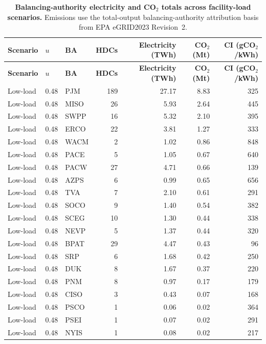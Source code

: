 \documentclass[12pt]{article}
\begin{document}
\begin{landscape}
\scriptsize
\begin{longtable}{ll l r r r r}
\caption{\textbf{Balancing-authority electricity and CO$_2$ totals across facility-load scenarios.} Emissions use the total-output balancing-authority attribution basis from EPA eGRID2023 Revision~2.}\label{tab:ba_scenarios_round3}\\
\toprule
\textbf{Scenario} & \textbf{$u$} & \textbf{BA} & \textbf{HDCs} & \textbf{Electricity (TWh)} & \textbf{CO$_2$ (Mt)} & \textbf{CI (gCO$_2$/kWh)} \\
\midrule
\endfirsthead
\toprule
\textbf{Scenario} & \textbf{$u$} & \textbf{BA} & \textbf{HDCs} & \textbf{Electricity (TWh)} & \textbf{CO$_2$ (Mt)} & \textbf{CI (gCO$_2$/kWh)} \\
\midrule
\endhead
Low-load & 0.48 & PJM & 189 & 27.17 & 8.83 & 325 \\
Low-load & 0.48 & MISO & 26 & 5.93 & 2.64 & 445 \\
Low-load & 0.48 & SWPP & 16 & 5.32 & 2.10 & 395 \\
Low-load & 0.48 & ERCO & 22 & 3.81 & 1.27 & 333 \\
Low-load & 0.48 & WACM & 2 & 1.02 & 0.86 & 848 \\
Low-load & 0.48 & PACE & 5 & 1.05 & 0.67 & 640 \\
Low-load & 0.48 & PACW & 27 & 4.71 & 0.66 & 139 \\
Low-load & 0.48 & AZPS & 6 & 0.99 & 0.65 & 656 \\
Low-load & 0.48 & TVA & 7 & 2.10 & 0.61 & 291 \\
Low-load & 0.48 & SOCO & 9 & 1.40 & 0.54 & 382 \\
Low-load & 0.48 & SCEG & 10 & 1.30 & 0.44 & 338 \\
Low-load & 0.48 & NEVP & 5 & 1.37 & 0.44 & 320 \\
Low-load & 0.48 & BPAT & 29 & 4.47 & 0.43 & 96 \\
Low-load & 0.48 & SRP & 6 & 1.68 & 0.42 & 250 \\
Low-load & 0.48 & DUK & 8 & 1.67 & 0.37 & 220 \\
Low-load & 0.48 & PNM & 8 & 0.97 & 0.17 & 179 \\
Low-load & 0.48 & CISO & 3 & 0.43 & 0.07 & 168 \\
Low-load & 0.48 & PSCO & 1 & 0.06 & 0.02 & 364 \\
Low-load & 0.48 & PSEI & 1 & 0.07 & 0.02 & 291 \\
Low-load & 0.48 & NYIS & 1 & 0.08 & 0.02 & 217 \\

\end{longtable}
\end{landscape}
\end{document}
